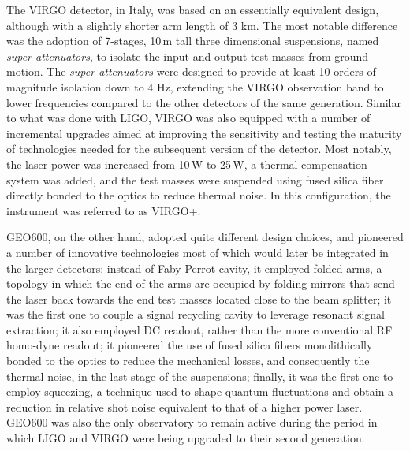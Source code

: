 The VIRGO detector\cite{Accadia_2012}, in Italy, was based on an essentially equivalent design, although with a slightly shorter arm length of 3 km.
The most notable difference was the adoption of 7-stages, 10\,m tall three dimensional suspensions, named \textit{super-attenuators}, to isolate the input and output test masses from ground motion.
The \textit{super-attenuators} were designed to provide at least 10 orders of magnitude isolation down to 4 Hz, extending the VIRGO observation band to lower frequencies compared to the other detectors of the same generation.
Similar to what was done with LIGO, VIRGO was also equipped with a number of incremental upgrades aimed at improving the sensitivity and testing the maturity of technologies needed for the subsequent version of the detector.
Most notably, the laser power was increased from 10\,W to 25\,W, a thermal compensation system was added, and the test masses were suspended using fused silica fiber directly bonded to the optics to reduce thermal noise. In this configuration, the instrument was referred to as VIRGO+.

GEO600\cite{L_ck_2006}, on the other hand, adopted quite different design choices, and pioneered a number of innovative technologies most of which would later be integrated in the larger detectors:
instead of Faby-Perrot cavity, it employed folded arms, a topology in which the end of the arms are occupied by folding mirrors that send the laser back towards the end test masses located close to the beam splitter;
it was the first one to couple a signal recycling cavity to leverage resonant signal extraction;
it also employed DC readout, rather than the more conventional RF homo-dyne readout;
it pioneered the use of fused silica fibers monolithically bonded to the optics to reduce the mechanical losses, and consequently the thermal noise, in the last stage of the suspensions;
finally, it was the first one to employ squeezing, a technique used to shape quantum fluctuations and obtain a reduction in relative shot noise equivalent to that of a higher power laser\cite{Abadie_2011}.
GEO600 was also the only observatory to remain active during the period in which LIGO and VIRGO were being upgraded to their second generation.


